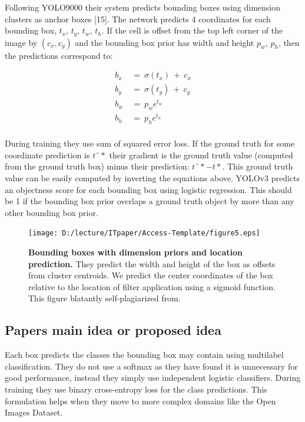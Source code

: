 \documentclass{ieeeaccess}
\begin{document}
Following YOLO9000 their system predicts bounding boxes using dimension clusters as anchor boxes [15]. The network predicts 4 coordinates for each bounding box, $t_x$, $t_y$, $t_w$, $t_h$. If the cell is offset from the top left corner of the image by $(c_x, c_y)$ and the bounding box prior has width and height $p_w$, $p_h$, then the predictions correspond to:

\begin{equation}
	\label{equation5}
	\begin{split}
	 b_x \ & = \ \sigma(t_x) \ + \ c_x \\
	 b_y \ & = \ \sigma(t_y) \ + \ c_y \\
	b_w \ & = \ p_w e^{t_w} \\
	b_h \ & = \ p_h e^{t_h} \\
	\end{split}
\end{equation}

During training they use sum of squared error loss. If the ground truth for some coordinate prediction is $tˆ*$ their gradient is the ground truth value (computed from the ground truth box) minus their prediction: $tˆ* − t*$. This ground truth value can be easily computed by inverting the equations above. YOLOv3 predicts an objectness score for each bounding box using logistic regression. This should be 1 if the bounding box prior overlaps a ground truth object by more than any other bounding box prior.

\begin{figure}
	\centering
		\texttt{[image: D:/lecture/ITpaper/Access-Template/figure5.eps]}
	\caption {\textbf{Bounding boxes with dimension priors and location prediction.} They predict the width and height of the box as offsets from cluster centroids. We predict the center coordinates of the box relative to the location of filter application using a sigmoid function. This figure blatantly self-plagiarized from.}
	\label{fig:figure5}
\end{figure}

\subsection{Papers main idea or proposed idea}
Each box predicts the classes the bounding box may contain using multilabel classification. They do not use a softmax as they have found it is unnecessary for good performance, instead they simply use independent logistic classifiers. During training they use binary cross-entropy loss for the class predictions. This formulation helps when they move to more complex domains like the Open Images Dataset.
\end{document}
